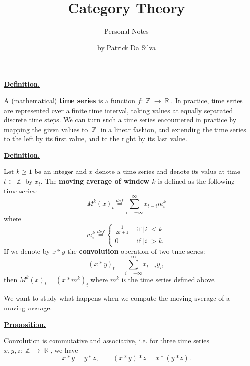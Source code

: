 \documentclass[11 pt]{article}
\title{\textbf{Category Theory}}
\date{by Patrick Da Silva}
\author{Personal Notes}
\newcommand{\1}{\operatorname{\mathbb I}}
\newcommand{\R}{\operatorname{\mathbb R}}
\newcommand{\Z}{\operatorname{\mathbb Z}}
\newcommand{\defn}{\overset{def}{=}}
\newcounter{env} %
\newenvironment{abb} %
{
	\begin{mdframed}[bottomline=false,topline=false,leftline=false,rightline=false,nobreak,leftmargin=-10 pt,rightmargin=0 pt,skipabove=0 pt,skipbelow=0 pt]
}
{
	\end{mdframed}
}
\newenvironment{definh}	
{\par
	\noindent \begin{abb} \textbf{\underline{Definition.}} \par
	\nopagebreak%
	\par
	\nopagebreak \itshape%
}
{%
	\par
	\end{abb}
}
\newenvironment{proph}	
{\par
	\noindent \begin{abb} \textbf{\underline{Proposition.}} \par
	\nopagebreak%
	\par
	\itshape%
}
{%
	\par
	\end{abb}
}
\begin{document}
\begin{definh}
    A (mathematical) \textbf{time series} is a function $f: \Z \to \R$. In practice, time series are represented over a finite time interval, taking values at equally separated discrete time steps. We can turn such a time series encountered in practice by mapping the given values to $\Z$ in a linear fashion, and extending the time series to the left by its first value, and to the right by its last value.  
\end{definh}

\begin{definh}
    Let $k \ge 1$ be an integer and $x$ denote a time series and denote its value at time $t \in \Z$ by $x_t$. The \textbf{moving average of window $k$} is defined as the following time series:
    \[
        M^k(x)_t \defn \sum_{i = -\infty}^{\infty} x_{t-i} m_i^k
    \]
    where
    \[
        m_i^k \defn
        \begin{cases}
            \frac 1{2k+1}   & \text{ if } |i| \le k \\
            0               & \text{ if } |i| > k.
        \end{cases}
    \]
    If we denote by $x * y$ the \textbf{convolution} operation of two time series:
    \[
        (x * y)_t = \sum_{i=-\infty}^{\infty} x_{t-i} y_i,
    \]
    then $M^k(x)_t = (x * m^k)_t$ where $m^k$ is the time series defined above.
\end{definh}

We want to study what happens when we compute the moving average of a moving average. 

\begin{proph}
    Convolution is commutative and associative, i.e. for three time series $x,y,z : \Z \to \R$, we have
    \[
            x * y = y * z, \qquad (x * y) * z = x * (y * z).
    \]
\end{proph}
\end{document}
